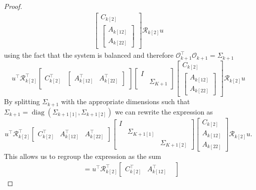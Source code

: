 \documentclass[doctype=mastersthesis,BCOR=15mm,biblatex]{ldvbook}%
\DeclareMathOperator{\diag}{diag}
\newcommand{\R}{\mathcal{R}} %
\newcommand{\Ob}{\mathcal{O}} %
\newcommand{\eye}{I} %
\begin{document}
\begin{proof}
\begin{align}
	\begin{bmatrix}
	C_{k[2]}\\
	\begin{bmatrix}
	A_{k[12]}\\
	A_{k[22]}
	\end{bmatrix}
	\end{bmatrix}  
	\R_{k[2]} u
\end{align}
using the fact that the system is balanced and therefore $\Ob_{k+1}^\top \Ob_{k+1} = \Sigma_{k+1}$
\begin{equation}
u^\top
\R_{k[2]}^\top
\begin{bmatrix}
C_{k[2]}^\top&
\begin{bmatrix}
A_{k[12]}^\top&
A_{k[22]}^\top
\end{bmatrix}
\end{bmatrix} 
\begin{bmatrix}
\eye & \\
& \Sigma_{K+1}
\end{bmatrix} 
\begin{bmatrix}
C_{k[2]}\\
\begin{bmatrix}
A_{k[12]}\\
A_{k[22]}
\end{bmatrix}
\end{bmatrix}  
\R_{k[2]} u
\end{equation}
By splitting $\Sigma_{k+1}$ with the appropriate dimensions such that  $\Sigma_{k+1} = \diag(\Sigma_{k+1[1]},\Sigma_{k+1[2]})$ we can rewrite the expression as
\begin{equation}
u^\top
\R_{k[2]}^\top
\begin{bmatrix}
C_{k[2]}^\top&
A_{k[12]}^\top&
A_{k[22]}^\top
\end{bmatrix} 
\begin{bmatrix}
\eye & \\
& \Sigma_{K+1[1]}\\
& & \Sigma_{K+1[2]}
\end{bmatrix} 
\begin{bmatrix}
C_{k[2]}\\
A_{k[12]}\\
A_{k[22]}
\end{bmatrix}  
\R_{k[2]} u
.
\end{equation}
This allows us to regroup the expression as the sum
\begin{align}
	&=
	u^\top
	\R_{k[2]}^\top
	\begin{bmatrix}
	C_{k[2]}^\top&
	A_{k[12]}^\top&
	\end{bmatrix} 

\end{align}
\end{proof}
\end{document}
